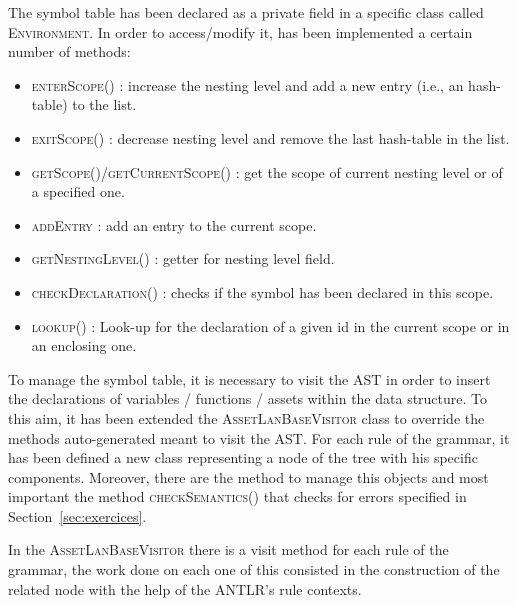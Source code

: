 \documentclass[11pt]{article} %
\begin{document}
The symbol table has been declared as a private field in a specific class called \textsc{Environment}. In order to access/modify it, has been implemented a certain number of methods:
\begin{itemize}
\item \textsc{enterScope()} : increase the nesting level and add a new entry (i.e., an hash-table) to the list. 
\item \textsc{exitScope()} : decrease nesting level and remove the last hash-table in the list.
\item \textsc{getScope()}/\textsc{getCurrentScope()} : get the scope of current nesting level or of a specified one.
\item \textsc{addEntry} : add an entry to the current scope.
\item \textsc{getNestingLevel()} : getter for nesting level field.
\item \textsc{checkDeclaration()} : checks if the symbol has been declared in this scope. 
\item \textsc{lookup()} : Look-up for the declaration of a given id in the current scope or in an enclosing one. 
\end{itemize}

\medskip

To manage the symbol table, it is necessary to visit the AST in order to insert the declarations of variables / functions / assets within the data structure. To this aim, it has been extended the \textsc{AssetLanBaseVisitor} class to override the methods auto-generated meant to visit the AST. For each rule of the grammar, it has been defined a new class representing a node of the tree with his specific components. Moreover, there are the method to manage this objects and most important the method \textsc{checkSemantics()} that checks for errors specified in Section~\ref{sec:exercices}.

\medskip

In the \textsc{AssetLanBaseVisitor} there is a visit method for each rule of the grammar, the work done on each one of this consisted in the construction of the related node with the help of the ANTLR's rule contexts. 
\end{document}
